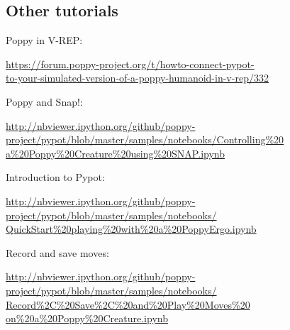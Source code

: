 \documentclass{article}
\begin{document}
\subsection{Other tutorials}

Poppy in V-REP:

\begin{flushright}
 \href{https://forum.poppy-project.org/t/howto-connect-pypot-to-your-simulated-version-of-a-poppy-humanoid-in-v-rep/332}{https://forum.poppy-project.org/t/howto-connect-pypot-\\to-your-simulated-version-of-a-poppy-humanoid-in-v-rep/332}
 \end{flushright}

Poppy and Snap!:

\begin{flushright}
\href{http://nbviewer.ipython.org/github/poppy-project/pypot/blob/master/samples/notebooks/Controlling%20a%20Poppy%20Creature%20using%20SNAP.ipynb}{http://nbviewer.ipython.org/github/poppy-project/pypot/blob/master/samples/notebooks/Controlling\%20\\a\%20Poppy\%20Creature\%20using\%20SNAP.ipynb}

\end{flushright}

Introduction to Pypot:
\begin{flushright}
\href{http://nbviewer.ipython.org/github/poppy-project/pypot/blob/master/samples/notebooks/QuickStart%20playing%20with%20a%20PoppyErgo.ipynb}{http://nbviewer.ipython.org/github/poppy-project/pypot/blob/master/samples/notebooks/\\QuickStart\%20playing\%20with\%20a\%20PoppyErgo.ipynb} 
\end{flushright}

Record and save moves:
\begin{flushright}
\href{http://nbviewer.ipython.org/github/poppy-project/pypot/blob/master/samples/notebooks/Record%2C%20Save%2C%20and%20Play%20Moves%20on%20a%20Poppy%20Creature.ipynb}{http://nbviewer.ipython.org/github/poppy-project/pypot/blob/master/samples/notebooks/\\Record\%2C\%20Save\%2C\%20and\%20Play\%20Moves\%20\\on\%20a\%20Poppy\%20Creature.ipynb} 
\end{flushright}
\end{document}
